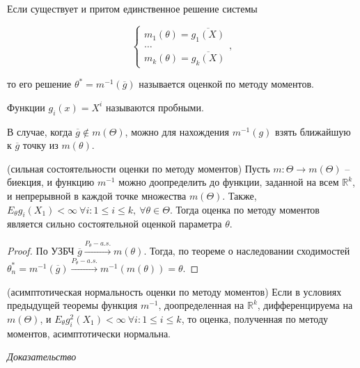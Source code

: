 \begin{definition}
Если существует и притом единственное решение системы


\begin{equation*}
\begin{cases}
m_{1}( \theta ) =\overline{g_{1}( X)}\\
\dotsc \\
m_{k}( \theta ) =\overline{g_{k}( X)}
\end{cases} ,
\end{equation*}


то его решение $\displaystyle \theta ^{*} =m^{-1}(\overline{g})$ называется оценкой по методу моментов.
\end{definition}
\begin{definition}
Функции $\displaystyle g_{i}( x) =X^{i}$ называются пробными.
\end{definition}
\begin{note}
В случае, когда $\displaystyle \overline{g} \notin m( \Theta )$, можно для нахождения $\displaystyle m^{-1}( g)$ взять ближайшую к $\displaystyle \overline{g}$ точку из $\displaystyle m( \theta )$.
\end{note}
\begin{theorem}
(сильная состоятельности оценки по методу моментов) Пусть $\displaystyle m:\Theta \rightarrow m( \Theta )$ -- биекция, и функцию $\displaystyle m^{-1}$ можно доопределить до функции, заданной на всем $\displaystyle \mathbb{R}^{k}$, и непрерывной в каждой точке множества $\displaystyle m( \Theta )$. Также, $\displaystyle E_{\theta } g_{i}( X_{1}) < \infty \ \forall i:1\leqslant i\leqslant k,\ \forall \theta \in \Theta $. Тогда оценка по методу моментов является сильно состоятельной оценкой параметра $\displaystyle \theta $.
\end{theorem}
\begin{proof}
    По УЗБЧ $\displaystyle \overline{g}\xrightarrow{P_{\theta } -a.s.} m( \theta )$. Тогда, по теореме о наследовании сходимостей $\displaystyle \theta _{n}^{*} =m^{-1}(\overline{g})\xrightarrow{P_{\theta } -a.s.} m^{-1}( m( \theta )) =\theta $.
\end{proof}
\begin{theorem}
(асимптотическая нормальность оценки по методу моментов) Если в условиях предыдущей теоремы функция $\displaystyle m^{-1}$, доопределенная на $\displaystyle \mathbb{R}^{k}$, дифференцируема на $\displaystyle m( \Theta )$, и $\displaystyle E_{\theta } g_{i}^{2}( X_{1}) < \infty \ \forall i:1\leqslant i\leqslant k$, то оценка, полученная по методу моментов, асимптотически нормальна.
\end{theorem}
\textit{Доказательство}

